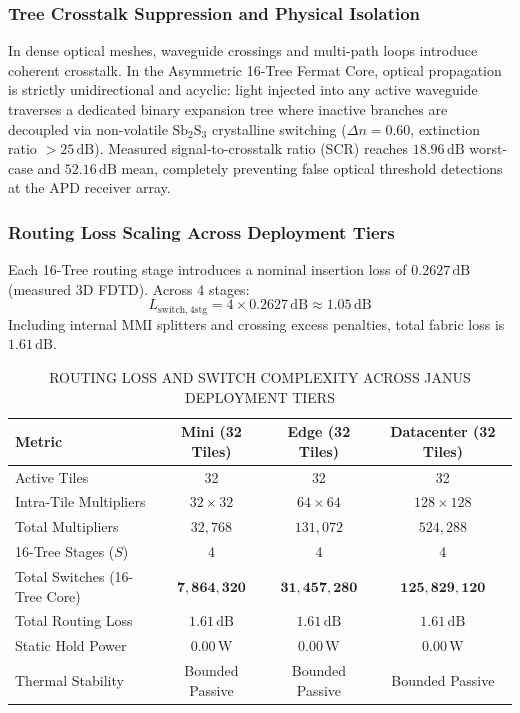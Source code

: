 \documentclass[journal]{IEEEtran}
\begin{document}
\subsubsection{\textbf{Tree Crosstalk Suppression and Physical Isolation}}
In dense optical meshes, waveguide crossings and multi-path loops introduce coherent crosstalk. In the Asymmetric 16-Tree Fermat Core, optical propagation is strictly unidirectional and acyclic: light injected into any active waveguide traverses a dedicated binary expansion tree where inactive branches are decoupled via non-volatile $\mathrm{Sb_2S_3}$ crystalline switching ($\Delta n = 0.60$, extinction ratio $> 25\,\mathrm{dB}$). Measured signal-to-crosstalk ratio (SCR) reaches $18.96\,\mathrm{dB}$ worst-case and $52.16\,\mathrm{dB}$ mean, completely preventing false optical threshold detections at the APD receiver array.

\subsubsection{\textbf{Routing Loss Scaling Across Deployment Tiers}}
Each 16-Tree routing stage introduces a nominal insertion loss of $0.2627\,\mathrm{dB}$ (measured 3D FDTD). Across 4 stages:
\begin{equation}
L_{\mathrm{switch,4stg}} = 4 \times 0.2627\,\mathrm{dB} \approx 1.05\,\mathrm{dB}
\end{equation}
Including internal MMI splitters and crossing excess penalties, total fabric loss is $1.61\,\mathrm{dB}$.

\begin{table}[htbp]
\centering
\small
\setlength{\tabcolsep}{6pt}
\renewcommand{\arraystretch}{1.15}
\caption{ROUTING LOSS AND SWITCH COMPLEXITY ACROSS JANUS DEPLOYMENT TIERS}
\label{tab:table6}
\begin{tabular*}{\textwidth}{@{\extracolsep{\fill}}lccc@{}}
\toprule
\textbf{Metric} & \textbf{Mini (32 Tiles)} & \textbf{Edge (32 Tiles)} & \textbf{Datacenter (32 Tiles)} \\
\midrule
Active Tiles & 32 & 32 & 32 \\
Intra-Tile Multipliers & $32 \times 32$ & $64 \times 64$ & $128 \times 128$ \\
Total Multipliers & $32{,}768$ & $131{,}072$ & $524{,}288$ \\
16-Tree Stages ($S$) & 4 & 4 & 4 \\
Total Switches (16-Tree Core) & $\mathbf{7{,}864{,}320}$ & $\mathbf{31{,}457{,}280}$ & $\mathbf{125{,}829{,}120}$ \\
Total Routing Loss & $\mathbf{1.61\,\mathrm{dB}}$ & $\mathbf{1.61\,\mathrm{dB}}$ & $\mathbf{1.61\,\mathrm{dB}}$ \\
Static Hold Power & $\mathbf{0.00\,\mathrm{W}}$ & $\mathbf{0.00\,\mathrm{W}}$ & $\mathbf{0.00\,\mathrm{W}}$ \\
Thermal Stability & Bounded Passive & Bounded Passive & Bounded Passive \\
\bottomrule
\end{tabular*}
\end{table}
\end{document}
